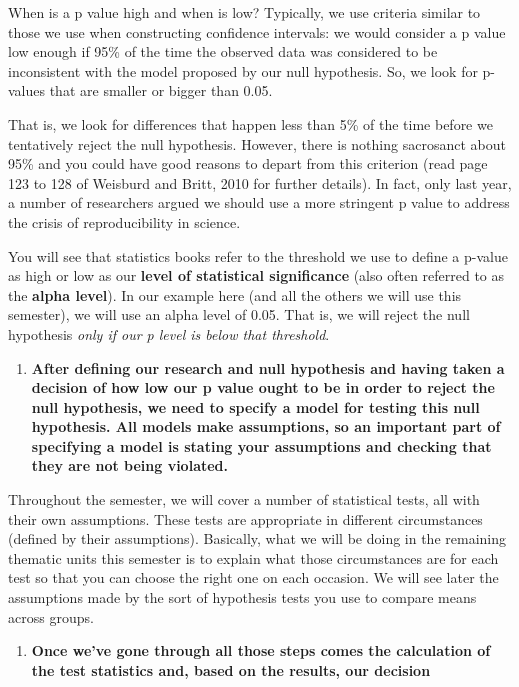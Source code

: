\documentclass[
]{book}
\providecommand{\tightlist}{%
  \setlength{\itemsep}{0pt}\setlength{\parskip}{0pt}}
\begin{document}
When is a p value high and when is low? Typically, we use criteria similar to those we use when constructing confidence intervals: we would consider a p value low enough if 95\% of the time the observed data was considered to be inconsistent with the model proposed by our null hypothesis. So, we look for p-values that are smaller or bigger than 0.05.

That is, we look for differences that happen less than 5\% of the time before we tentatively reject the null hypothesis. However, there is nothing sacrosanct about 95\% and you could have good reasons to depart from this criterion (read page 123 to 128 of Weisburd and Britt, 2010 for further details). In fact, only last year, a number of researchers argued we should use a more stringent p value to address the crisis of reproducibility in science.

You will see that statistics books refer to the threshold we use to define a p-value as high or low as our \textbf{level of statistical significance} (also often referred to as the \textbf{alpha level}). In our example here (and all the others we will use this semester), we will use an alpha level of 0.05. That is, we will reject the null hypothesis \emph{only if our p level is below that threshold}.

\begin{enumerate}
\def\labelenumi{\arabic{enumi}.}
\setcounter{enumi}{4}
\tightlist
\item
  \textbf{After defining our research and null hypothesis and having taken a decision of how low our p value ought to be in order to reject the null hypothesis, we need to specify a model for testing this null hypothesis. All models make assumptions, so an important part of specifying a model is stating your assumptions and checking that they are not being violated. }
\end{enumerate}

Throughout the semester, we will cover a number of statistical tests, all with their own assumptions. These tests are appropriate in different circumstances (defined by their assumptions). Basically, what we will be doing in the remaining thematic units this semester is to explain what those circumstances are for each test so that you can choose the right one on each occasion. We will see later the assumptions made by the sort of hypothesis tests you use to compare means across groups.

\begin{enumerate}
\def\labelenumi{\arabic{enumi}.}
\setcounter{enumi}{5}
\tightlist
\item
  \textbf{Once we've gone through all those steps comes the calculation of the test statistics and, based on the results, our decision}
\end{enumerate}
\end{document}

